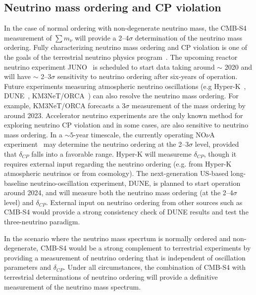 \subsection{Neutrino mass ordering and CP violation}
In the case of normal ordering with non-degenerate neutrino mass, the CMB-S4 measurement of $\sum m_\nu$ will provide a 2--4$\sigma$ determination of the neutrino mass ordering. Fully characterizing neutrino mass ordering and CP violation is one of the goals of the terrestrial neutrino physics program~\cite{Patterson:2015xja}. The upcoming reactor neutrino experiment JUNO~\cite{An:2015jdp} is scheduled to start data taking around $\sim$ 2020 and will have $\sim$ 2--3$\sigma$ sensitivity to neutrino ordering after six-years of operation. Future experiments measuring atmospheric neutrino oscillations (e.g Hyper-K~\cite{Abe:2015zbg}, DUNE~\cite{Goodman:2015gmv}, KM3NeT/ORCA~\cite{Adrian-Martinez:2016fdl}) can also resolve the neutrino mass ordering. For example, KM3NeT/ORCA forecasts a 3$\sigma$ measurement of the mass ordering by around 2023. Accelerator neutrino experiments are the only known method for exploring neutrino CP violation and in some cases, are also sensitive to neutrino mass ordering. In a $\sim 5$-year timescale, the currently operating NO$\nu$A experiment~\cite{Adamson:2016tbq} may determine the neutrino ordering at the 2--3$\sigma$ level, provided that $\delta_{CP}$ falls into a favorable range. Hyper-K will measureme $\delta_{CP}$, though it requires external input regarding the neutrino ordering (e.g. from Hyper-K atmospheric neutrinos or from cosmology). The next-generation US-based long-baseline neutrino-oscillation experiment, DUNE, is planned to start operation around 2024, and will measure both the neutrino mass ordering (at the 2--4$\sigma$ level) and $\delta_{CP}$. External input on neutrino ordering from other sources such as CMB-S4 would provide a strong consistency check of DUNE results and test the three-neutrino paradigm.

In the scenario where the neutrino mass specrtum is normally ordered and non-degenerate, CMB-S4 would be a strong complement to terrestrial experiments by providing a measurement of neutrino ordering that is independent of oscillation parameters and $\delta_{CP}$. Under all circumstances, the combination of CMB-S4 with terrestrial determinations of neutrino ordering will provide a definitive measurement of the neutrino mass spectrum.



